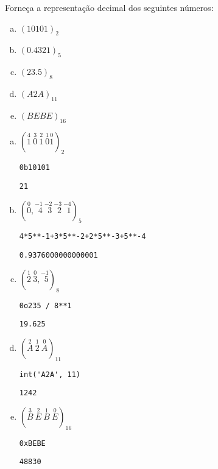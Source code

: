 \begin{exeresol}
  Forneça a representação decimal dos seguintes números:
  \begin{enumerate}[a)]
  \item $(10101)_2$
  \item $(0.4321)_5$
  \item $(23.5)_8$
  \item $(A2A)_{11}$
  \item $(BEBE)_{16}$
  \end{enumerate}
\end{exeresol}
\begin{resol}
  \begin{enumerate}[a)]
  \item $(\stackrel{4}{1}~\stackrel{3}{0}~\stackrel{2}{1}~\stackrel{1}{0}\stackrel{0}{1})_2$

\begin{lstlisting}
0b10101
\end{lstlisting}

\begin{verbatim}
21
\end{verbatim}

  \item $(\stackrel{0}{0},\stackrel{-1}{~\,4}~\stackrel{-2}{~\,3}~\stackrel{-3}{~\,2}~\stackrel{-4}{~\,1})_5$

\begin{lstlisting}
4*5**-1+3*5**-2+2*5**-3+5**-4
\end{lstlisting}

\begin{verbatim}
0.9376000000000001
\end{verbatim}
  
  \item $(\stackrel{1}{2}~\stackrel{0}{3},\stackrel{-1}{~\,5})_8$

\begin{lstlisting}
0o235 / 8**1
\end{lstlisting}

\begin{verbatim}
19.625
\end{verbatim}

  \item $(\stackrel{2}{A}~\stackrel{1}{2}~\stackrel{0}{A})_{11}$

\begin{lstlisting}
int('A2A', 11)
\end{lstlisting}

\begin{verbatim}
1242
\end{verbatim}

  \item $(\stackrel{3}{B}~\stackrel{2}{E}~\stackrel{1}{B}~\stackrel{0}{E})_{16}$

\begin{lstlisting}
0xBEBE
\end{lstlisting}

\begin{verbatim}
48830
\end{verbatim}

  \end{enumerate}
\end{resol}

